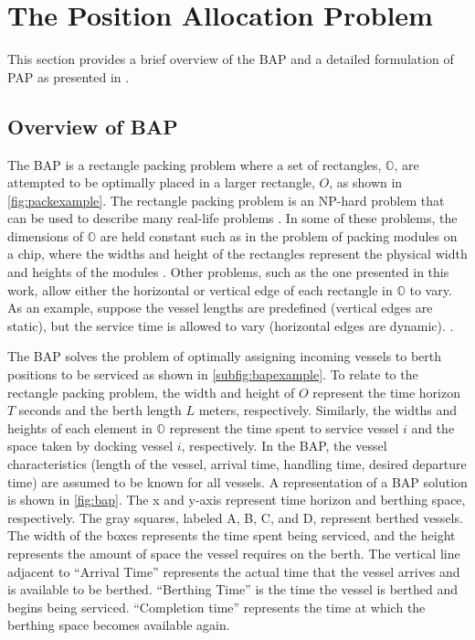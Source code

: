 \documentclass[utf8]{FrontiersinHarvard}
\let\cite\citep                                       %
\begin{document}
\section{The Position Allocation Problem}
\label{sec:the-position-allocation-problem}
This section provides a brief overview of the BAP and a detailed formulation of PAP as presented in
\cite{qarebagh-2019-optim-sched}.

\subsection{Overview of BAP}
\label{sec:overview-of-bap}
The BAP is a rectangle packing problem where a set of rectangles, \(\mathbb{O}\), are attempted to be optimally placed in
a larger rectangle, \(O\), as shown in \autoref{fig:packexample}. The rectangle packing problem is an NP-hard problem that
can be used to describe many real-life problems \cite{bruin-2013-rectan-packin,murata-1995-rectan}. In some of these
problems, the dimensions of \(\mathbb{O}\) are held constant such as in the problem of packing modules on a chip, where
the widths and height of the rectangles represent the physical width and heights of the modules
\cite{murata-1995-rectan}. Other problems, such as the one presented in this work, allow either the horizontal or
vertical edge of each rectangle in \(\mathbb{O}\) to vary. As an example, suppose the vessel lengths are predefined
(vertical edges are static), but the service time is allowed to vary (horizontal edges are dynamic).
\cite{buhrkal-2011-model-discr}.

The BAP solves the problem of optimally assigning incoming vessels to berth positions to be serviced as shown in
\autoref{subfig:bapexample}. To relate to the rectangle packing problem, the width and height of \(O\) represent the time
horizon \(T\) seconds and the berth length \(L\) meters, respectively. Similarly, the widths and heights of each element in
\(\mathbb{O}\) represent the time spent to service vessel \(i\) and the space taken by docking vessel \(i\), respectively. In
the BAP, the vessel characteristics (length of the vessel, arrival time, handling time, desired departure time) are
assumed to be known for all vessels. A representation of a BAP solution is shown in \autoref{fig:bap}. The x and y-axis
represent time horizon and berthing space, respectively. The gray squares, labeled A, B, C, and D, represent berthed
vessels. The width of the boxes represents the time spent being serviced, and the height represents the amount of space
the vessel requires on the berth. The vertical line adjacent to ``Arrival Time'' represents the actual time that the
vessel arrives and is available to be berthed. ``Berthing Time'' is the time the vessel is berthed and begins being
serviced. ``Completion time'' represents the time at which the berthing space becomes available again.
\end{document}
